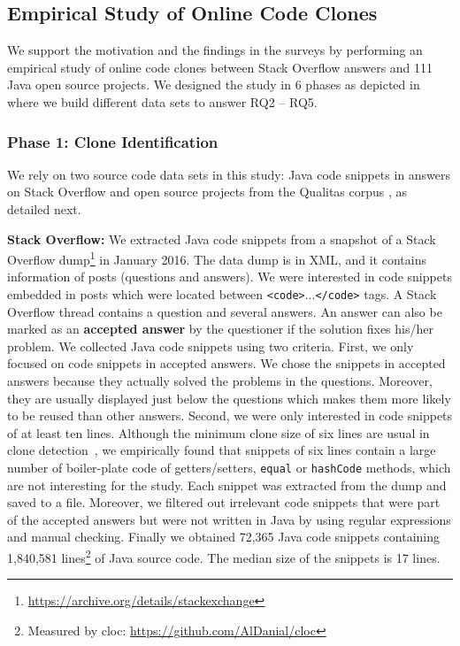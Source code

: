 \documentclass[10pt,journal,compsoc]{IEEEtran}
\begin{document}
\subsection{Empirical Study of Online Code Clones}
We support the motivation and the findings in the surveys by performing
an empirical study of online code clones between Stack Overflow
answers and 111 Java open source projects.
We designed the study in 6 phases as depicted in  where
we build different data sets to answer RQ2 -- RQ5. 

\subsubsection{Phase 1: Clone Identification}

We rely on two source code data sets in this study: Java code snippets in answers
on Stack Overflow and open source projects from the Qualitas corpus
\cite{QualitasCorpus}, as detailed next.

\textbf{Stack Overflow:} We extracted Java code snippets from a snapshot of a
Stack Overflow dump\footnote{\url{https://archive.org/details/stackexchange}} in
January 2016. %
The data dump is in XML, and it contains information of posts (questions and
answers). We were interested in code snippets embedded in posts which were
located between {\small\texttt{<code>}...\texttt{</code>}} tags. A Stack
Overflow thread contains a question and several answers. An answer can also be
marked as an \textbf{accepted answer} by the questioner if the solution fixes
his/her problem. We collected Java code snippets using two criteria. First, we
only focused on code snippets in accepted answers. We chose the snippets in
accepted answers because they actually solved the problems in the questions.
Moreover, they are usually displayed just below the questions which makes them
more likely to be reused than other answers. Second, we were only interested in
code snippets of at least ten lines. Although the minimum clone size of six
lines are usual in clone detection~\cite{Bellon2007,Wang2013,Koschke2006}, we
empirically found that snippets of six lines contain a large number of
boiler-plate code of getters/setters, \texttt{equal} or \texttt{hashCode}
methods, which are not interesting for the study. Each snippet was extracted
from the dump and saved to a file. Moreover, we filtered out irrelevant code
snippets that were part of the accepted answers but were not written in Java by
using regular expressions and manual checking.
Finally we obtained 72,365 Java code snippets containing 1,840,581
lines\footnote{Measured by cloc: \url{https://github.com/AlDanial/cloc}} of Java
source code. The median size of the snippets is 17 lines.
\end{document}
